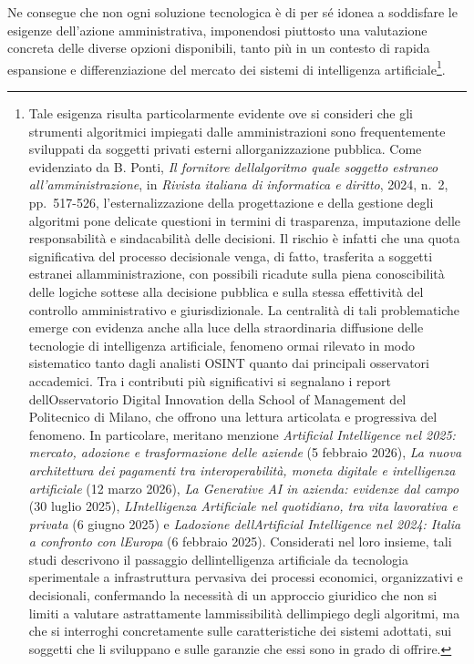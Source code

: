 \documentclass[american,a4paper,]{article}
\begin{document}
Ne consegue che non ogni soluzione tecnologica è di per sé idonea a soddisfare le esigenze dell'azione amministrativa, imponendosi piuttosto una valutazione concreta delle diverse opzioni disponibili, tanto più in un contesto di rapida espansione e differenziazione del mercato dei sistemi di intelligenza artificiale\footnote{Tale esigenza risulta particolarmente evidente ove si consideri che gli strumenti algoritmici impiegati dalle amministrazioni sono frequentemente sviluppati da soggetti privati esterni all\textquotesingle organizzazione pubblica. Come evidenziato da B. Ponti, \emph{Il fornitore dell\textquotesingle algoritmo quale soggetto estraneo all'amministrazione}, in \emph{Rivista italiana di informatica e diritto}, 2024, n.~2, pp.~517-526, l'esternalizzazione della progettazione e della gestione degli algoritmi pone delicate questioni in termini di trasparenza, imputazione delle responsabilità e sindacabilità delle decisioni. Il rischio è infatti che una quota significativa del processo decisionale venga, di fatto, trasferita a soggetti estranei all\textquotesingle amministrazione, con possibili ricadute sulla piena conoscibilità delle logiche sottese alla decisione pubblica e sulla stessa effettività del controllo amministrativo e giurisdizionale. La centralità di tali problematiche emerge con evidenza anche alla luce della straordinaria diffusione delle tecnologie di intelligenza artificiale, fenomeno ormai rilevato in modo sistematico tanto dagli analisti OSINT quanto dai principali osservatori accademici. Tra i contributi più significativi si segnalano i report dell\textquotesingle Osservatorio Digital Innovation della School of Management del Politecnico di Milano, che offrono una lettura articolata e progressiva del fenomeno. In particolare, meritano menzione \emph{Artificial Intelligence nel 2025: mercato, adozione e trasformazione delle aziende} (5 febbraio 2026), \emph{La nuova architettura dei pagamenti tra interoperabilità, moneta digitale e intelligenza artificiale} (12 marzo 2026), \emph{La Generative AI in azienda: evidenze dal campo} (30 luglio 2025), \emph{L\textquotesingle Intelligenza Artificiale nel quotidiano, tra vita lavorativa e privata} (6 giugno 2025) e \emph{L\textquotesingle adozione dell\textquotesingle Artificial Intelligence nel 2024: Italia a confronto con l\textquotesingle Europa} (6 febbraio 2025). Considerati nel loro insieme, tali studi descrivono il passaggio dell\textquotesingle intelligenza artificiale da tecnologia sperimentale a infrastruttura pervasiva dei processi economici, organizzativi e decisionali, confermando la necessità di un approccio giuridico che non si limiti a valutare astrattamente l\textquotesingle ammissibilità dell\textquotesingle impiego degli algoritmi, ma che si interroghi concretamente sulle caratteristiche dei sistemi adottati, sui soggetti che li sviluppano e sulle garanzie che essi sono in grado di offrire.}.
\end{document}
